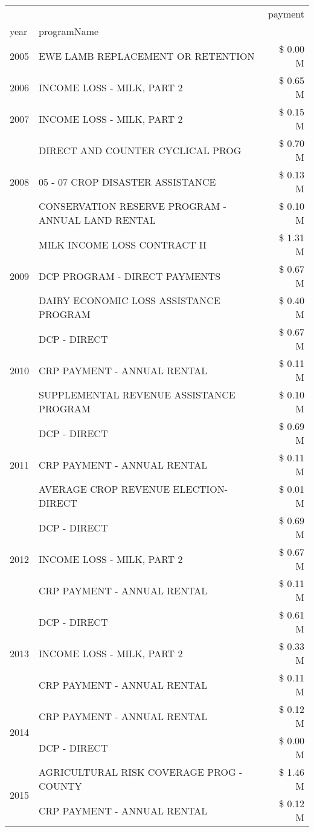 \begin{tabular}{llr}
\toprule
 &  & payment \\
year & programName &  \\
\midrule
2005 & EWE LAMB REPLACEMENT OR RETENTION & \$ 0.00 M \\
\cline{1-3}
2006 & INCOME LOSS - MILK, PART 2 & \$ 0.65 M \\
\cline{1-3}
2007 & INCOME LOSS - MILK, PART 2 & \$ 0.15 M \\
\cline{1-3}
\multirow[t]{3}{*}{2008} & DIRECT AND COUNTER CYCLICAL PROG & \$ 0.70 M \\
 & 05 - 07 CROP DISASTER ASSISTANCE & \$ 0.13 M \\
 & CONSERVATION RESERVE PROGRAM - ANNUAL LAND RENTAL & \$ 0.10 M \\
\cline{1-3}
\multirow[t]{3}{*}{2009} & MILK INCOME LOSS CONTRACT II & \$ 1.31 M \\
 & DCP PROGRAM - DIRECT PAYMENTS & \$ 0.67 M \\
 & DAIRY ECONOMIC LOSS ASSISTANCE PROGRAM & \$ 0.40 M \\
\cline{1-3}
\multirow[t]{3}{*}{2010} & DCP - DIRECT & \$ 0.67 M \\
 & CRP PAYMENT - ANNUAL RENTAL & \$ 0.11 M \\
 & SUPPLEMENTAL REVENUE ASSISTANCE PROGRAM & \$ 0.10 M \\
\cline{1-3}
\multirow[t]{3}{*}{2011} & DCP - DIRECT & \$ 0.69 M \\
 & CRP PAYMENT - ANNUAL RENTAL & \$ 0.11 M \\
 & AVERAGE CROP REVENUE ELECTION-DIRECT & \$ 0.01 M \\
\cline{1-3}
\multirow[t]{3}{*}{2012} & DCP - DIRECT & \$ 0.69 M \\
 & INCOME LOSS - MILK, PART 2 & \$ 0.67 M \\
 & CRP PAYMENT - ANNUAL RENTAL & \$ 0.11 M \\
\cline{1-3}
\multirow[t]{3}{*}{2013} & DCP - DIRECT & \$ 0.61 M \\
 & INCOME LOSS - MILK, PART 2 & \$ 0.33 M \\
 & CRP PAYMENT - ANNUAL RENTAL & \$ 0.11 M \\
\cline{1-3}
\multirow[t]{2}{*}{2014} & CRP PAYMENT - ANNUAL RENTAL & \$ 0.12 M \\
 & DCP - DIRECT & \$ 0.00 M \\
\cline{1-3}
\multirow[t]{2}{*}{2015} & AGRICULTURAL RISK COVERAGE PROG - COUNTY & \$ 1.46 M \\
 & CRP PAYMENT - ANNUAL RENTAL & \$ 0.12 M \\

\end{tabular}
